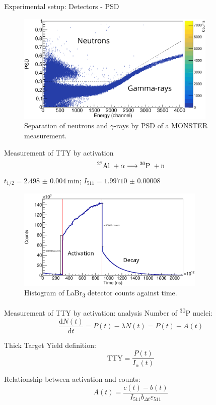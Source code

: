 \documentclass[11pt]{beamer}
\newcommand{\dif}{\text{d}}
\newcommand{\ddt}[1]{\frac{\dif #1}{\dif t}}
\newcommand{\Aliso}{\textsuperscript{27}Al }
\newcommand{\Piso}{\textsuperscript{30}P }
\begin{document}
\begin{frame}{Experimental setup: Detectors - PSD}
	\begin{figure}[H]
		\centering
		\includegraphics[width=0.85\textwidth]{example_psd.eps}
		\caption{Separation of neutrons and $\gamma$-rays by PSD of a MONSTER measurement.}
		\label{}
	\end{figure}
\end{frame}






\begin{frame}{Measurement of TTY by activation}
	\[ \text{\Aliso} + \alpha \longrightarrow \text{\Piso} + \text{n}   \]
	\centering
	$t_{1/2} = \qty{2.498(4)}{\minute}$; 
	$I_{511} = \num{1.99710(8)}$
	\begin{figure}[H]
		\centering
		\includegraphics[width=0.80\textwidth]{example_activation_time_histogram.eps}
		\caption{Histogram of LaBr\textsubscript{3} detector counts against time.}
		\label{example_activation_time_histogram}
	\end{figure}
\end{frame}

\begin{frame}{Measurement of TTY by activation: analysis}
	Number of \Piso nuclei:
	\begin{equation}
		\ddt{N(t)} = P(t) -\lambda N(t) = P(t) - A(t)
		\label{general_diffeq}
	\end{equation}

	Thick Target Yield definition:
	\begin{equation}
		\text{TTY} = \frac{P(t)}{I_\alpha(t)}
	\end{equation}

	Relationship between activation and counts:
	\begin{equation}
		A(t) = \frac{c(t) - b(t)}{I_{511} b_{\Delta t} \varepsilon_{511}}
	\end{equation}
\end{frame}
\end{document}
